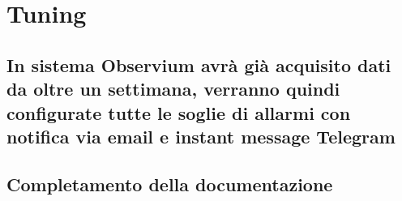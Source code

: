 \documentclass[Realizzazione.tex]{subfiles}
\begin{document}
\section{Tuning}
\subsection{In sistema Observium avrà già acquisito dati da oltre un settimana, verranno quindi configurate tutte le soglie di allarmi con notifica via email e instant message Telegram}
\subsection{Completamento della documentazione}
	
\end{document}
